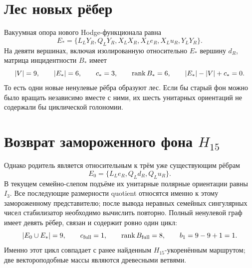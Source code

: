 \section{Лес новых рёбер}

Вакуумная опора нового Hodge-функционала равна
\begin{equation}
 E_*=\{L_LY_R,Q_LY_R,X_LX_R,X_Le_R,X_Lu_R,Y_LY_R\}.
 \label{eq:v7-real-arrow-selected-edges}
\end{equation}
На девяти вершинах, включая изолированную относительно $E_*$ вершину $d_R$,
матрица инцидентности $B_*$ имеет
\begin{equation}
 |V|=9,\qquad |E_*|=6,\qquad c_*=3,\qquad
 \operatorname{rank} B_*=6,\qquad |E_*|-|V|+c_*=0.
 \label{eq:v7-real-arrow-selected-forest}
\end{equation}
То есть одни новые ненулевые рёбра образуют лес. Если бы старый фон можно
было вращать независимо вместе с ними, их шесть унитарных ориентаций не
содержали бы циклической голономии.

\section{Возврат замороженного фона \texorpdfstring{$H_{15}$}{H15}}

Однако родитель является относительным к трём уже существующим рёбрам
\begin{equation}
 E_0=\{L_Le_R,Q_Ld_R,Q_Lu_R\}.
 \label{eq:v7-real-arrow-baseline-edges}
\end{equation}
В текущем семейно-слепом подъёме их унитарные полярные ориентации равны
$I_3$. Все последующие размерности quotient относятся именно к этому
замороженному представителю; после вывода неравных семейных сингулярных
чисел стабилизатор необходимо вычислить повторно.
Полный ненулевой граф имеет девять рёбер, связан и содержит ровно один цикл:
\begin{equation}
 |E_0\cup E_*|=9,\qquad c_{\rm full}=1,\qquad
 \operatorname{rank} B_{\rm full}=8,\qquad
 b_1=9-9+1=1.
 \label{eq:v7-real-arrow-full-cycle-rank}
\end{equation}
Именно этот цикл совпадает с ранее найденным $H_{15}$-укоренённым маршрутом;
две вектороподобные массы являются древесными ветвями.

